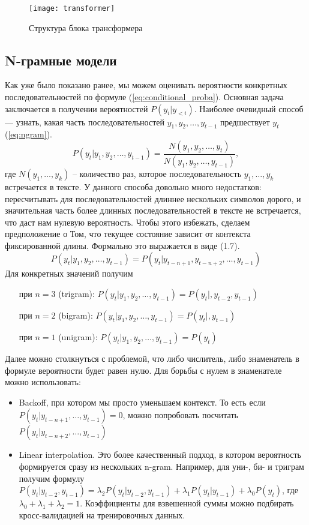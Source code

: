 \begin{figure}[ht]
	\centering
	\texttt{[image: transformer]}  
	\caption{ Структура блока трансформера}
	\label{fig:transformer}
\end{figure}

\subsection{N-грамные модели}
\label{sub:domain:n_gram}

Как уже было показано ранее, мы можем оценивать вероятности конкретных последовательностей по формуле (\ref{eq:conditional_proba}). Основная задача заключается в получении вероятностей $P(y_i|y_{<i})$. Наиболее очевидный способ --- узнать, какая часть последовательностей $y_1, y_2,\dots, y_{t-1}$ предшествует $y_t$ (\ref{eq:ngram}).
\begin{equation}
	P(y_t|y_1,y_2,\dots,y_{t-1}) = \frac{N(y_1,y_2,\dots,y_t)}{N(y_1,y_2,\dots,y_{t-1})},
	\label{eq:ngram}
\end{equation} где $N(y_1,\dots,y_k)$ -- количество раз, которое последовательность $y_1,\dots,y_k$ встречается в тексте. У данного способа довольно много недостатков: пересчитывать для последовательностей длиннее нескольких символов дорого, и значительная часть более длинных последовательностей в тексте не встречается, что даст нам нулевую вероятность. Чтобы этого избежать, сделаем предположение о Том, что текущее состояние зависит от контекста фиксированной длины. Формально это выражается в виде (1.7).
\begin{equation}
	P(y_t|y_1,y_2,\dots,y_{t-1}) = P(y_t|y_{t-n+1}, y_{t-n+2},\dots,y_{t-1})
\end{equation}
Для конкретных значений получим
\begin{itemize}
	\item[при] $n = 3$ (trigram): $P(y_t|y_1,y_2,\dots,y_{t-1}) = P(y_t|, y_{t-2},y_{t-1})$
	\item[при] $n = 2$ (bigram): $P(y_t|y_1,y_2,\dots,y_{t-1}) = P(y_t|, y_{t-1})$
	\item[при] $n = 1$ (unigram): $P(y_t|y_1,y_2,\dots,y_{t-1}) = P(y_t)$
\end{itemize}

Далее можно столкнуться с проблемой, что либо числитель, либо знаменатель в формуле вероятности будет равен нулю. Для борьбы с нулем в знаменателе можно использовать:

\begin{itemize}
	\item Backoff, при котором мы просто уменьшаем контекст. То есть если $P(y_t|y_{t-n+1},\dots,y_{t-1}) = 0$, можно попробовать посчитать $P(y_t|y_{t-n+2},\dots,y_{t-1})$
	\item Linear interpolation. Это более качественный подход, в котором вероятность формируется сразу из нескольких n-gram. Например, для уни-, би- и триграм получим формулу $P(y_t|y_{t-2}, y_{t-1}) = \lambda_2P(y_t|y_{t-2}, y_{t-1}) + \lambda_1P(y_t|y_{t-1}) + \lambda_0P(y_t)$, где $\lambda_0 + \lambda_1 + \lambda_2 = 1$. Коэффициенты для взвешенной суммы можно подбирать кросс-валидацией на тренировочных данных.
\end{itemize}

